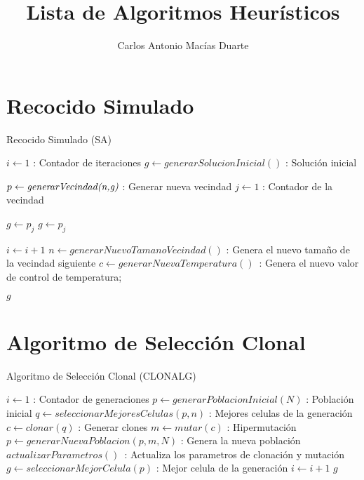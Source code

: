 \documentclass[10pt,letterpaper,twoside,openright]{article}
\author{Carlos Antonio Macías Duarte}
\title{Lista de Algoritmos Heurísticos}
\begin{document}
	\maketitle
	
	\newpage
			
	\section{Recocido Simulado}
	
		\begin{algorithm}[H]
			\caption{Recocido Simulado (SA)}
				$ i \leftarrow 1 $ : Contador de iteraciones\;
				$ g \leftarrow generarSolucionInicial() $ : Solución inicial\;
				{
					$ p \leftarrow \emph{generarVecindad(n,g)}$ : Generar nueva vecindad\;
					$ j \leftarrow 1 $ : Contador de la vecindad\;
					{
						{
							$ g \leftarrow p_{j} $\;
						}
						{
							$ g \leftarrow p_{j} $\;
						}
						
					}			
					$ i \leftarrow  i + 1 $\;
					$ n \leftarrow  generarNuevoTamanoVecindad() $ : Genera el nuevo tamaño de la vecindad siguiente\;
					$ c \leftarrow  generarNuevaTemperatura() $\ :  Genera el nuevo valor de control de temperatura;
				}
		 		\Return $ g $
		 \end{algorithm}
		 
		 \newpage
		 
			
	\section{Algoritmo de Selección Clonal}
	
		\begin{algorithm}[H]
			\caption{Algoritmo de Selección Clonal (CLONALG)}
				$ i \leftarrow 1 $ : Contador de generaciones\;
				$ p \leftarrow generarPoblacionInicial(N) $ : Población inicial\;
				{
					$ q \leftarrow seleccionarMejoresCelulas(p, n) $ : Mejores celulas de la generación\;
					$ c \leftarrow clonar(q)$ : Generar clones\;
					$ m \leftarrow mutar(c)$ : Hipermutación\;
					$ p \leftarrow  generarNuevaPoblacion(p, m, N) $ : Genera la nueva población\;
					$actualizarParametros() $\ :  Actualiza los parametros de clonación y mutación\;
					$ g \leftarrow seleccionarMejorCelula(p) $ : Mejor celula de la generación\;
					$ i \leftarrow  i + 1 $\;
				}
		 		\Return $ g $
		 \end{algorithm}
		 
\end{document}
